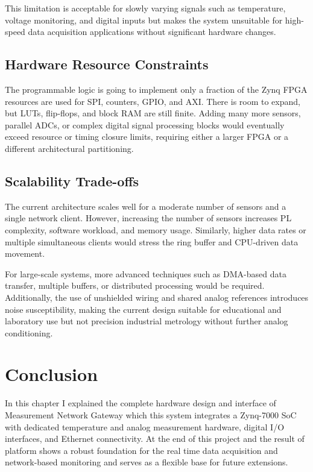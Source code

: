 This limitation is acceptable for slowly varying signals such as temperature, voltage monitoring, and digital inputs but makes the system unsuitable for high-speed data acquisition applications without significant hardware changes.

\subsection{Hardware Resource Constraints}
The programmable logic is going to implement only a fraction of the Zynq FPGA resources are used for SPI, counters, GPIO, and AXI. There is room to expand, but LUTs, flip-flops, and block RAM are still finite.
Adding many more sensors, parallel ADCs, or complex digital signal processing blocks would eventually exceed resource or timing closure limits, requiring either a larger FPGA or a different architectural partitioning.


\subsection{Scalability Trade-offs}
The current architecture scales well for a moderate number of sensors and a single network client. However, increasing the number of sensors increases PL complexity, software workload, and memory usage. Similarly, higher data rates or multiple simultaneous clients would stress the ring buffer and CPU-driven data movement.

For large-scale systems, more advanced techniques such as DMA-based data transfer, multiple buffers, or distributed processing would be required. Additionally, the use of unshielded wiring and shared analog references introduces noise susceptibility, making the current design suitable for educational and laboratory use but not precision industrial metrology without further analog conditioning.


\section{Conclusion}
In this chapter I explained the complete hardware design and interface of Measurement Network Gateway which this system integrates a Zynq-7000 SoC with dedicated temperature and analog measurement hardware, digital I/O interfaces, and Ethernet connectivity. At the end of this project and the result of platform shows a robust foundation for the real time data acquisition and network-based monitoring and serves as a flexible base for future extensions.
